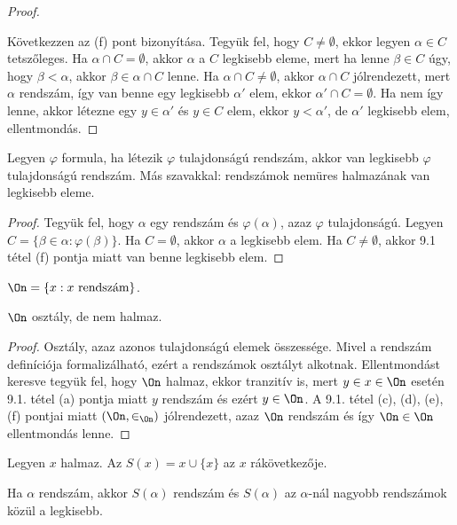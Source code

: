 \begin{proof}
\begin{enumerate}
\end{enumerate}
Következzen az (f) pont bizonyítása. Tegyük fel, hogy $C \neq \emptyset$, ekkor legyen $\alpha \in C$ tetszőleges. Ha $\alpha \cap C = \emptyset$, akkor $\alpha$ a $C$ legkisebb eleme, mert ha lenne $\beta \in C$ úgy, hogy $\beta < \alpha$, akkor $\beta \in \alpha \cap C$ lenne. Ha $\alpha \cap C \neq \emptyset$, akkor $\alpha \cap C$ jólrendezett, mert $\alpha$ rendszám, így van benne egy legkisebb $\alpha'$ elem, ekkor $\alpha' \cap C = \emptyset$. Ha nem így lenne, akkor létezne egy $y \in \alpha'$ és $y \in C$ elem, ekkor $y < \alpha'$, de $\alpha'$ legkisebb elem, ellentmondás.
\end{proof}
\begin{theo} Legyen $\varphi$ formula, ha létezik $\varphi$ tulajdonságú rendszám, akkor van legkisebb $\varphi$ tulajdonságú rendszám. Más szavakkal: rendszámok nemüres halmazának van legkisebb eleme.
\end{theo}
\begin{proof}
Tegyük fel, hogy $\alpha$ egy rendszám és $\varphi(\alpha)$, azaz $\varphi$ tulajdonságú. Legyen $C= \lbrace \beta \in \alpha : \varphi(\beta) \rbrace$. Ha $C = \emptyset$, akkor $\alpha$ a legkisebb elem. Ha $C \neq \emptyset$, akkor 9.1 tétel (f) pontja miatt van benne legkisebb elem.
\end{proof}
\begin{defi} $\On = \lbrace x : x \text{ rendszám} \rbrace$.
\end{defi}
\begin{state} $\On$ osztály, de nem halmaz.
\end{state}
\begin{proof} Osztály, azaz azonos tulajdonságú elemek összessége. Mivel a rendszám definíciója formalizálható, ezért a rendszámok osztályt alkotnak. Ellentmondást keresve tegyük fel, hogy $\On$ halmaz, ekkor tranzitív is, mert $y \in x \in \On$ esetén 9.1. tétel (a) pontja miatt $y$ rendszám és ezért $y \in \On$. A 9.1. tétel (c), (d), (e), (f) pontjai miatt $(\On,\in_{\On})$ jólrendezett, azaz $\On$ rendszám és így $\On \in \On$ ellentmondás lenne.
\end{proof}
\begin{defi} Legyen $x$ halmaz. Az $S(x)= x \cup \lbrace x \rbrace$ az $x$ rákövetkezője.
\end{defi}
\begin{state} Ha $\alpha$ rendszám, akkor $S(\alpha)$ rendszám és $S(\alpha)$ az $\alpha$-nál nagyobb rendszámok közül a legkisebb.
\end{state}
